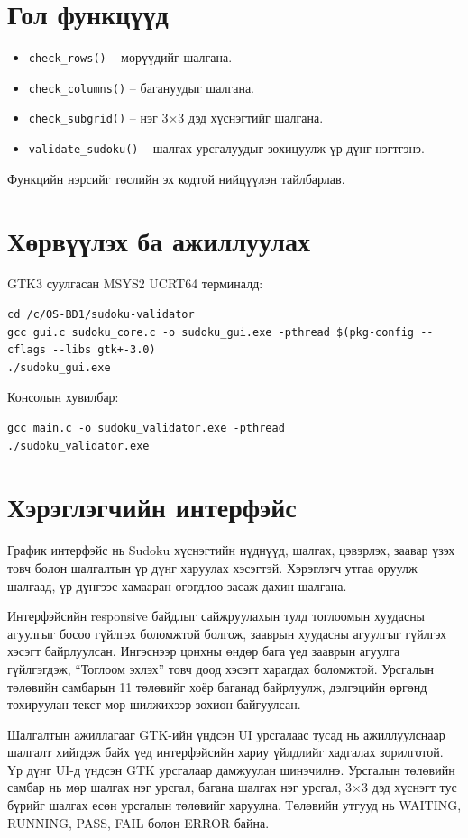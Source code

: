 \documentclass[12pt,a4paper]{report}
\begin{document}
\section{Гол функцүүд}
\begin{itemize}\item \texttt{check\_rows()} -- мөрүүдийг шалгана.\item \texttt{check\_columns()} -- багануудыг шалгана.\item \texttt{check\_subgrid()} -- нэг 3$\times$3 дэд хүснэгтийг шалгана.\item \texttt{validate\_sudoku()} -- шалгах урсгалуудыг зохицуулж үр дүнг нэгтгэнэ.\end{itemize}
Функцийн нэрсийг төслийн эх кодтой нийцүүлэн тайлбарлав.
\section{Хөрвүүлэх ба ажиллуулах}
GTK3 суулгасан MSYS2 UCRT64 терминалд:
\begin{lstlisting}[basicstyle=\ttfamily\small,breaklines=true,frame=single]
cd /c/OS-BD1/sudoku-validator
gcc gui.c sudoku_core.c -o sudoku_gui.exe -pthread $(pkg-config --cflags --libs gtk+-3.0)
./sudoku_gui.exe
\end{lstlisting}
Консолын хувилбар:
\begin{lstlisting}[basicstyle=\ttfamily\small,breaklines=true,frame=single]
gcc main.c -o sudoku_validator.exe -pthread
./sudoku_validator.exe
\end{lstlisting}
\section{Хэрэглэгчийн интерфэйс}
График интерфэйс нь Sudoku хүснэгтийн нүднүүд, шалгах, цэвэрлэх, заавар үзэх товч болон шалгалтын үр дүнг харуулах хэсэгтэй. Хэрэглэгч утгаа оруулж шалгаад, үр дүнгээс хамааран өгөгдлөө засаж дахин шалгана.

Интерфэйсийн responsive байдлыг сайжруулахын тулд тоглоомын хуудасны агуулгыг босоо гүйлгэх боломжтой болгож, зааврын хуудасны агуулгыг гүйлгэх хэсэгт байрлуулсан. Ингэснээр цонхны өндөр бага үед зааврын агуулга гүйлгэгдэж, “Тоглоом эхлэх” товч доод хэсэгт харагдах боломжтой. Урсгалын төлөвийн самбарын 11 төлөвийг хоёр баганад байрлуулж, дэлгэцийн өргөнд тохируулан текст мөр шилжихээр зохион байгуулсан.

Шалгалтын ажиллагааг GTK-ийн үндсэн UI урсгалаас тусад нь ажиллуулснаар шалгалт хийгдэж байх үед интерфэйсийн хариу үйлдлийг хадгалах зорилготой. Үр дүнг UI-д үндсэн GTK урсгалаар дамжуулан шинэчилнэ. Урсгалын төлөвийн самбар нь мөр шалгах нэг урсгал, багана шалгах нэг урсгал, 3$\times$3 дэд хүснэгт тус бүрийг шалгах есөн урсгалын төлөвийг харуулна. Төлөвийн утгууд нь WAITING, RUNNING, PASS, FAIL болон ERROR байна.
\end{document}
